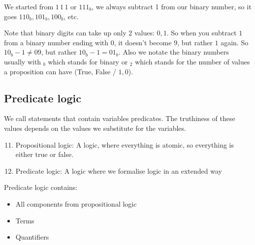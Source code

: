 \documentclass{article}
\begin{document}
We started from $1\,1\,1$ or $111_{b}$, we always subtract 1 from our binary number, so it goes $110_{b}, 101_{b}, 100_{b}$, etc.

Note that binary digits can take up only 2 values: $0, 1$. So when you subtract $1$ from a binary number ending with $0$, it doesn't become $9$, but rather $1$ again. So $10_{b}-1 \neq 09$, but rather $10_{b}-1 = 01_{b}$. Also we notate the binary numbers usually with $_{b}$ which stands for binary or $_{2}$ which stands for the number of values a proposition can have (True, False / $1, 0$).

\newpage
\subsection{Predicate logic}

We call statements that contain variables predicates.
The truthiness of these values depends on the values we substitute for the variables.

\begin{enumerate}[label=Def. \arabic*:, leftmargin=3.5em, align=left]
  \setcounter{enumi}{10}
  \item Propositional logic: A logic, where everything is atomic, so everything is either true or false.
  
  \item Predicate logic: A logic where we formalise logic in an extended way
\end{enumerate}

Predicate logic contains:
\begin{itemize}
  \item All components from propositional logic
  
  \item Terms
  
  \item Quantifiers
\end{itemize}
\end{document}
